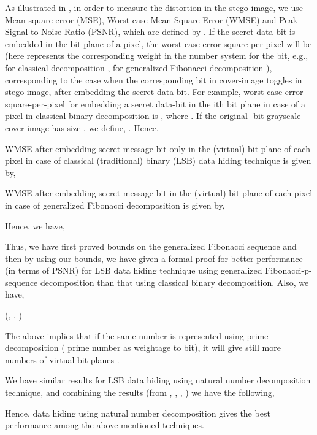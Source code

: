 \documentclass{ijcsa}
\begin{document}
As illustrated in \cite{dey08}, in order to measure the distortion in the stego-image, we use Mean square error (MSE),
Worst case Mean Square Error (WMSE) and Peak Signal to Noise Ratio (PSNR), which are defined by
 \cite{dey08}.
If the secret data-bit is embedded in the  bit-plane of a pixel, the worst-case
error-square-per-pixel will be  (here  represents the corresponding weight in the number system for the  bit, e.g., for classical decomposition , for generalized Fibonacci decomposition ), corresponding to the case when the corresponding bit in cover-image toggles in stego-image, after embedding the secret data-bit. For example, worst-case error-square-per-pixel for embedding a secret data-bit in the ith bit plane in case of a pixel in classical
binary decomposition is , where . If the original -bit
grayscale cover-image has size , we define,  \cite{dey08}. 
Hence,
\par WMSE after embedding secret message bit only in the  (virtual) bit-plane of each pixel in case of classical 
(traditional) binary (LSB) data hiding technique is given by,


\par WMSE after embedding secret message bit in the  (virtual) bit-plane of each pixel in case of 
generalized Fibonacci decomposition is given by,

 

\par Hence, we have,


\par Thus, we have first proved bounds on the generalized Fibonacci sequence and then by using our bounds, 
we have given a formal proof for better performance (in terms of PSNR) for LSB data hiding technique using 
generalized Fibonacci-p-sequence decomposition than that using classical binary decomposition. Also, we have,

{ (\cite{telang99}, \cite{niven66}, \cite{tatt05})}
\par The above implies that if the same number is represented using prime decomposition ( prime number as weightage 
to  bit), it will give still more numbers of virtual bit planes \cite{battisti06}. 

\par We have similar results for LSB data hiding using natural number decomposition technique, and combining the results 
(from \cite{battisti06}, \cite{dey07a}, \cite{dey07b}, \cite{dey08}) we have the following,


\par Hence, data hiding using natural number decomposition gives the best performance among the above mentioned techniques.
\end{document}
